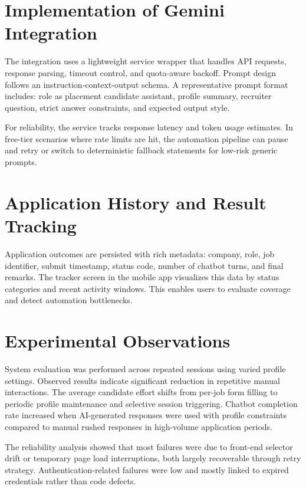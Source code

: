 \documentclass[12pt,a4paper,oneside]{report}
\begin{document}
\section{Implementation of Gemini Integration}
The integration uses a lightweight service wrapper that handles API requests, response parsing, timeout control, and quota-aware backoff. Prompt design follows an instruction-context-output schema. A representative prompt format includes: role as placement candidate assistant, profile summary, recruiter question, strict answer constraints, and expected output style.

For reliability, the service tracks response latency and token usage estimates. In free-tier scenarios where rate limits are hit, the automation pipeline can pause and retry or switch to deterministic fallback statements for low-risk generic prompts.

\section{Application History and Result Tracking}
Application outcomes are persisted with rich metadata: company, role, job identifier, submit timestamp, status code, number of chatbot turns, and final remarks. The tracker screen in the mobile app visualizes this data by status categories and recent activity windows. This enables users to evaluate coverage and detect automation bottlenecks.

\section{Experimental Observations}
System evaluation was performed across repeated sessions using varied profile settings. Observed results indicate significant reduction in repetitive manual interactions. The average candidate effort shifts from per-job form filling to periodic profile maintenance and selective session triggering. Chatbot completion rate increased when AI-generated responses were used with profile constraints compared to manual rushed responses in high-volume application periods.

The reliability analysis showed that most failures were due to front-end selector drift or temporary page load interruptions, both largely recoverable through retry strategy. Authentication-related failures were low and mostly linked to expired credentials rather than code defects.
\end{document}
